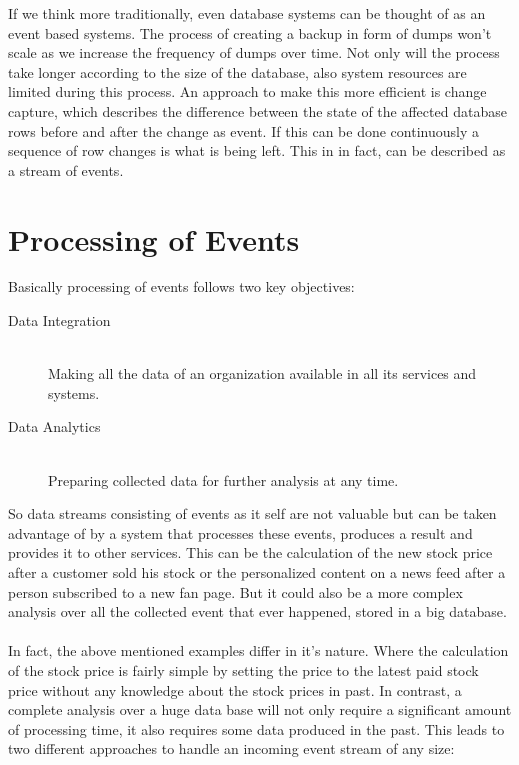 If we think more traditionally, even database systems can be thought of as an
event based systems. The process of creating a backup in form of dumps won't
scale as we increase the frequency of dumps over time. Not only will the process
take longer according to the size of the database, also system resources are
limited during this process. An approach to make this more efficient 
is change capture, which describes the difference between the state of the
affected database rows before and after the change as event. If this can be done
continuously a sequence of row changes is what is being left. This in in fact,
can be described as a stream of events.

\section{Processing of Events}
Basically processing of events follows two key objectives: 
\begin{description}
    \item [Data Integration] \hfill \\ Making all the data of an organization available in all its services and systems.
    \item [Data Analytics]  \hfill \\ Preparing collected data for further analysis at any time. 
\end{description}

So data streams consisting of events as it self are not valuable but
can be taken advantage of by a system that processes these events, produces a
result and provides it to other services. This can be the calculation of the new
stock price after a customer sold his stock or the personalized content on a
news feed after a person subscribed to a new fan page. But it could also be a
more complex analysis over all the collected event that ever happened, stored in
a big database. 
\\ \\
In fact, the above mentioned examples differ in it's nature. Where the
calculation of the stock price is fairly simple by setting the price to the
latest paid stock price without any knowledge about the stock prices in past. 
In contrast, a complete analysis over a huge data base will not only require a
significant amount of processing time, it also requires some data produced in the
past. This leads to two different approaches to handle an incoming event stream
of any size: 

